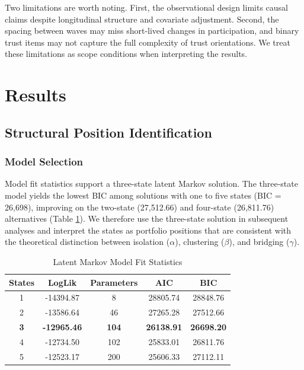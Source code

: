 Two limitations are worth noting. First, the observational design limits causal claims despite longitudinal structure and covariate adjustment. Second, the spacing between waves may miss short-lived changes in participation, and binary trust items may not capture the full complexity of trust orientations. We treat these limitations as scope conditions when interpreting the results.

\section{Results}

\subsection{Structural Position Identification}

\subsubsection{Model Selection}

Model fit statistics support a three-state latent Markov solution. The three-state model yields the lowest BIC among solutions with one to five states (BIC = 26{,}698), improving on the two-state (27{,}512.66) and four-state (26{,}811.76) alternatives (Table \ref{table:model_fit}). We therefore use the three-state solution in subsequent analyses and interpret the states as portfolio positions that are consistent with the theoretical distinction between isolation ($\alpha$), clustering ($\beta$), and bridging ($\gamma$).

\begin{table}[H]
\centering
\caption{Latent Markov Model Fit Statistics}
\label{table:model_fit}
\begin{tabular}{ccccc}
\hline
States & LogLik & Parameters & AIC & BIC \\
\hline
1 & -14394.87 & 8 & 28805.74 & 28848.76 \\ 
2 & -13586.64 & 46 & 27265.28 & 27512.66 \\ 
\textbf{3} & \textbf{-12965.46} & \textbf{104} & \textbf{26138.91} & \textbf{26698.20} \\ 
4 & -12734.50 & 102 & 25833.01 & 26811.76 \\ 
5 & -12523.17 & 200 & 25606.33 & 27112.11 \\ 
\hline
\end{tabular}
\end{table}


